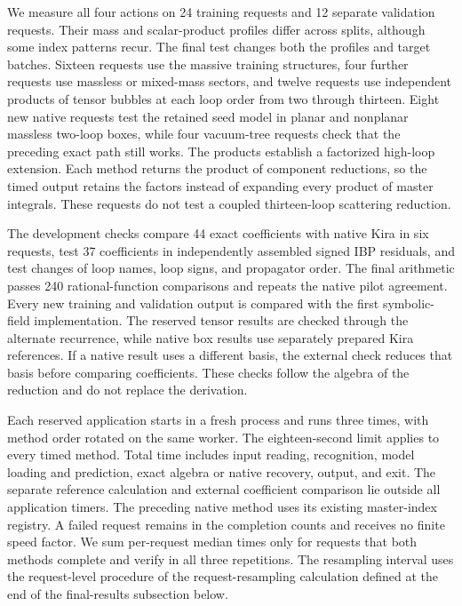 We measure all four actions on 24 training requests and 12 separate validation requests. Their mass and scalar-product profiles differ across splits, although some index patterns recur. The final test changes both the profiles and target batches. Sixteen requests use the massive training structures, four further requests use massless or mixed-mass sectors, and twelve requests use independent products of tensor bubbles at each loop order from two through thirteen. Eight new native requests test the retained seed model in planar and nonplanar massless two-loop boxes, while four vacuum-tree requests check that the preceding exact path still works. The products establish a factorized high-loop extension. Each method returns the product of component reductions, so the timed output retains the factors instead of expanding every product of master integrals. These requests do not test a coupled thirteen-loop scattering reduction.

The development checks compare 44 exact coefficients with native Kira in six requests, test 37 coefficients in independently assembled signed IBP residuals, and test changes of loop names, loop signs, and propagator order. The final arithmetic passes 240 rational-function comparisons and repeats the native pilot agreement. Every new training and validation output is compared with the first symbolic-field implementation. The reserved tensor results are checked through the alternate recurrence, while native box results use separately prepared Kira references. If a native result uses a different basis, the external check reduces that basis before comparing coefficients. These checks follow the algebra of the reduction and do not replace the derivation.

Each reserved application starts in a fresh process and runs three times, with method order rotated on the same worker. The eighteen-second limit applies to every timed method. Total time includes input reading, recognition, model loading and prediction, exact algebra or native recovery, output, and exit. The separate reference calculation and external coefficient comparison lie outside all application timers. The preceding native method uses its existing master-index registry. A failed request remains in the completion counts and receives no finite speed factor. We sum per-request median times only for requests that both methods complete and verify in all three repetitions. The resampling interval uses the request-level procedure of the request-resampling calculation defined at the end of the final-results subsection below.

